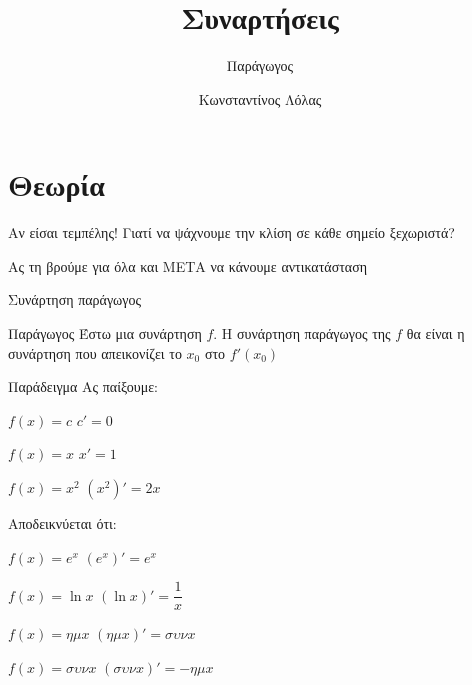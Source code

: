 \documentclass{presentation}
\title{Συναρτήσεις}
\subtitle{Παράγωγος}
\author[Λόλας]{Κωνσταντίνος Λόλας}
\institute[$10^ο$ ΓΕΛ]{$10^ο$ ΓΕΛ Θεσσαλονίκης}
\begin{document}
\begin{frame}
  \titlepage
\end{frame}

\section{Θεωρία}
\begin{frame}{Αν είσαι τεμπέλης!}
  Γιατί να ψάχνουμε την κλίση σε κάθε σημείο ξεχωριστά? \pause

  Ας τη βρούμε για όλα και ΜΕΤΑ να κάνουμε αντικατάσταση
\end{frame}

\begin{frame}{Συνάρτηση παράγωγος}
  \begin{block}{Παράγωγος}
    Έστω μια συνάρτηση $f$. Η συνάρτηση παράγωγος της $f$ θα είναι η συνάρτηση που απεικονίζει το $x_0$ στο $f'(x_0)$
  \end{block}
\end{frame}

\begin{frame}{Παράδειγμα}
  Ας παίξουμε:
  \begin{block}{$f(x)=c$}
    $c'=0$
  \end{block} \pause

  \begin{block}{$f(x)=x$}
    $x'=1$
  \end{block} \pause

  \begin{block}{$f(x)=x^2$}
    $(x^2)'=2x$
  \end{block}
\end{frame}

\begin{frame}{Αποδεικνύεται ότι:}
  \begin{block}{$f(x)=e^x$}
    $(e^x)'=e^x$
  \end{block} \pause

  \begin{block}{$f(x)=\ln x$}
    $(\ln x)'=\dfrac{1}{x}$
  \end{block} \pause

  \begin{block}{$f(x)=ημx$}
    $(ημx)'=συνx$
  \end{block} \pause

  \begin{block}{$f(x)=συνx$}
    $(συνx)'=-ημx$
  \end{block}
\end{frame}
\end{document}
